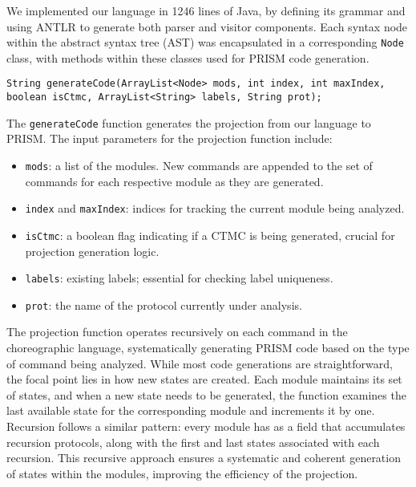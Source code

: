 We implemented our language in 1246 lines of Java, by defining its
grammar and using ANTLR \cite{ANTLR} to generate both parser and
visitor components. Each syntax node within the abstract syntax tree
(AST) was encapsulated in a corresponding {\tt Node} class, with
methods within these classes used for PRISM code generation.
\begin{lstlisting}[language=Eclipse,caption=The \texttt{generateCode} function,label=genfun1,numbers=none]
	String generateCode(ArrayList<Node> mods, int index, int maxIndex, boolean isCtmc, ArrayList<String> labels, String prot);	
\end{lstlisting}
The {\tt generateCode} function generates the projection from our language to PRISM.
The input parameters for the projection function include:
\begin{itemize}
\item \texttt{mods}: a list of the modules.  New commands are appended to the set of commands for each respective module as they are generated.
\item \texttt{index} and \texttt{maxIndex}: indices for tracking the current module being analyzed.
\item \texttt{isCtmc}: a boolean flag indicating if a CTMC is being generated, crucial for projection generation logic.
\item \texttt{labels}: existing labels; essential for checking label uniqueness.
\item \texttt{prot}: the name of the protocol currently under analysis.
\end{itemize}
The projection function operates recursively on each command in the
choreographic language, systematically generating PRISM code based on
the type of command being analyzed. While most code generations are
straightforward, the focal point lies in how new states are
created. Each module maintains its set of states, and when a new state
needs to be generated, the function examines the last available state
for the corresponding module and increments it by one.  Recursion
follows a similar pattern: every module has as a field %
that accumulates recursion protocols, along with the first and last
states associated with each recursion. This recursive approach ensures
a systematic and coherent generation of states within the modules,
improving the efficiency of the projection.


